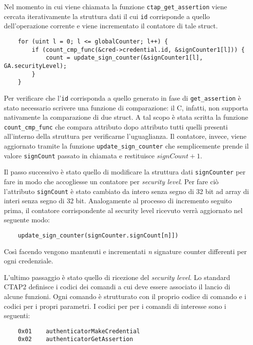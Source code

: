 Nel momento in cui viene chiamata la funzione \verb*|ctap_get_assertion| viene cercata iterativamente la struttura dati il cui \verb*|id| corrisponde a quello dell'operazione corrente e viene incrementato il contatore di tale struct. 

\begin{verbatim}
    for (uint l = 0; l <= globalCounter; l++) {
        if (count_cmp_func(&cred->credential.id, &signCounter1[l])) {
            count = update_sign_counter(&signCounter1[l], GA.securityLevel);
        }
    }
\end{verbatim}

Per verificare che l'\verb*|id| corrisponda a quello generato in fase di \verb*|get_assertion| è stato necessario scrivere una funzione di comparazione: il C, infatti, non supporta nativamente la comparazione di due struct. A tal scopo è stata scritta la funzione \verb*|count_cmp_func| che compara attributo dopo attributo tutti quelli presenti all'interno della struttura per verificarne l'uguaglianza.
Il contatore, invece, viene aggiornato tramite la funzione \verb*|update_sign_counter| che semplicemente prende il valore \verb*|signCount| passato in chiamata e restituisce $signCount + 1$.

Il passo successivo è stato quello di modificare la struttura dati \verb*|signCounter| per fare in modo che accogliesse un contatore per \emph{security level}. Per fare ciò l'attributo \verb*|signCount| è stato cambiato da intero senza segno di 32 bit ad array di interi senza segno di 32 bit. Analogamente al processo di incremento seguito prima, il contatore corrispondente al security level ricevuto verrà aggiornato nel seguente modo:
\begin{verbatim}
	update_sign_counter(signCounter.signCount[n]])
\end{verbatim}
Così facendo vengono mantenuti e incrementati \emph{n} signature counter differenti per ogni credenziale. 


L'ultimo passaggio è stato quello di ricezione del \emph{security level}. Lo standard CTAP2 \cite{fido:ctap_commands} definisce i codici dei comandi a cui deve essere associato il lancio di alcune funzioni. Ogni comando è strutturato con il proprio codice di comando e i codici per i propri parametri. I codici per per i comandi di interesse sono i seguenti: 
\begin{verbatim}
	0x01	authenticatorMakeCredential
	0x02	authenticatorGetAssertion
\end{verbatim}


